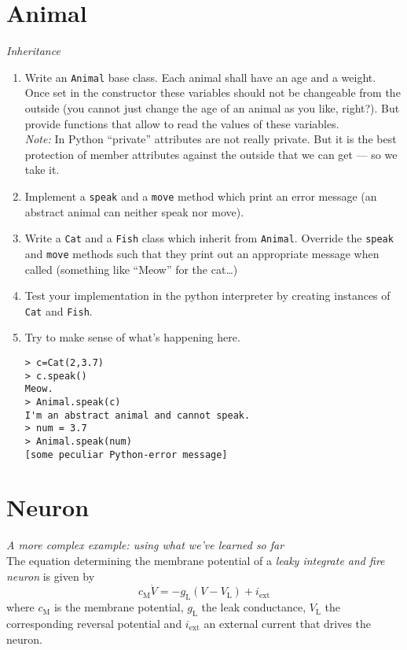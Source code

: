 \documentclass[12pt]{article}
\newcommand{\ind}[1]{_{\mathrm{#1}}}
\begin{document}
\section{Animal}
\textit{Inheritance}\\
\begin{enumerate}
\item Write an \texttt{Animal} base class. Each animal shall have an age and a weight. Once set in the constructor these variables should not be changeable from the outside (you cannot just change the age of an animal as you like, right?). But provide functions that allow to read the values of these variables.\\
\emph{Note:} In Python ``private'' attributes are not really private. But it is the best protection of member attributes against the outside that we can get --- so we take it.
\item Implement a \texttt{speak} and a \texttt{move} method which print an error message (an abstract animal can neither speak nor move).
\item Write a \texttt{Cat} and a \texttt{Fish} class which inherit from \texttt{Animal}. Override the \texttt{speak} and \texttt{move} methods such that they print out an appropriate message when called (something like ``Meow'' for the cat\dots)
\item Test your implementation in the python interpreter by creating instances of \texttt{Cat} and \texttt{Fish}.
\item Try to make sense of what's happening here.
\begin{lstlisting}
> c=Cat(2,3.7)
> c.speak()
Meow.
> Animal.speak(c)
I'm an abstract animal and cannot speak.
> num = 3.7
> Animal.speak(num)
[some peculiar Python-error message]
\end{lstlisting}
\end{enumerate}

\section{Neuron}
\textit{A more complex example: using what we've learned so far}\\
The equation determining the membrane potential of a \emph{leaky integrate and fire neuron} is given by 
\[c\ind{M}\dot{V}=-g\ind{L}\left(V-V\ind{L}\right)+i\ind{ext}\]
where $c\ind{M}$ is the membrane potential, $g\ind{L}$ the leak conductance, $V\ind{L}$ the corresponding reversal potential and $i\ind{ext}$ an external current that drives the neuron.
\end{document}
